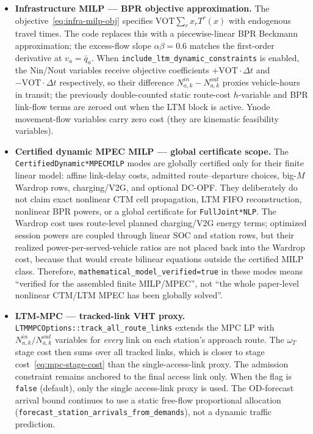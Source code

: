 \begin{remark}
\begin{itemize}
  \item \textbf{Infrastructure MILP --- BPR objective approximation.}
    The objective~\eqref{eq:infra-milp-obj} specifies
    $\mathrm{VOT}\sum_r x_r T^r(x)$ with endogenous travel times.
    The code replaces this with a piecewise-linear BPR Beckmann
    approximation; the excess-flow slope $\alpha\beta=0.6$ matches
    the first-order derivative at $v_a=\bar{q}_a$.  When
    \texttt{include\_ltm\_dynamic\_constraints} is enabled, the
    Nin/Nout variables receive objective coefficients
    $+\mathrm{VOT}\cdot\Delta t$ and $-\mathrm{VOT}\cdot\Delta t$
    respectively, so their difference $N^{in}_{a,k}-N^{out}_{a,k}$
    proxies vehicle-hours in transit; the previously double-counted
    static route-cost $h$-variable and BPR link-flow terms are zeroed
    out when the LTM block is active.  Ynode movement-flow variables
    carry zero cost (they are kinematic feasibility variables).

  \item \textbf{Certified dynamic MPEC MILP --- global certificate scope.}
    The \texttt{CertifiedDynamic*MPECMILP} modes are globally certified only
    for their finite linear model: affine link-delay costs, admitted
    route--departure choices, big-\(M\) Wardrop rows, charging/V2G, and
    optional DC-OPF.  They deliberately do not claim exact nonlinear CTM cell
    propagation, LTM FIFO reconstruction, nonlinear BPR powers, or a global
    certificate for \texttt{FullJoint*NLP}.  The Wardrop cost uses
    route-level planned charging/V2G energy terms; optimized session powers
    are coupled through linear SOC and station rows, but their realized
    power-per-served-vehicle ratios are not placed back into the Wardrop cost,
    because that would create bilinear equations outside the certified MILP
    class.  Therefore,
    \texttt{mathematical\_model\_verified=true} in these modes means
    ``verified for the assembled finite MILP/MPEC'', not ``the whole
    paper-level nonlinear CTM/LTM MPEC has been globally solved''.

  \item \textbf{LTM-MPC --- tracked-link VHT proxy.}
    \texttt{LTMMPCOptions::track\_all\_route\_links} extends the MPC LP
    with $N^{in}_{a,k}/N^{out}_{a,k}$ variables for \emph{every} link
    on each station's approach route.  The $\omega_T$ stage cost then
    sums over all tracked links, which is closer to
    stage cost~\eqref{eq:mpc-stage-cost} than the single-access-link proxy.
    The admission constraint
    remains anchored to the final access link only.  When the flag is
    \texttt{false} (default), only the single access-link proxy is used.
    The OD-forecast arrival bound continues to use a static free-flow
    proportional allocation
    (\texttt{forecast\_station\_arrivals\_from\_demands}), not a
    dynamic traffic prediction.
\end{itemize}
\end{remark}
